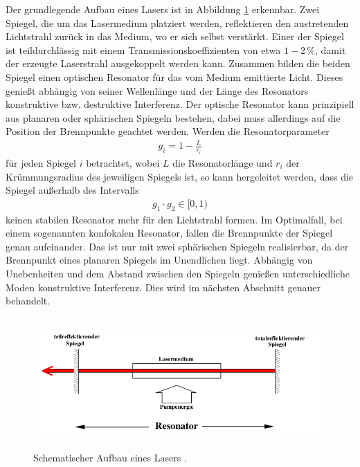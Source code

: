 Der grundlegende Aufbau eines Lasers ist in Abbildung \ref{fig:laseraufbau} erkennbar.
Zwei Spiegel, die um das Lasermedium platziert werden, reflektieren den austretenden
Lichtstrahl zurück in das Medium, wo er sich selbst verstärkt. Einer der Spiegel ist
teildurchlässig mit einem Transmissionskoeffizienten von etwa $1-2 \, \si{\percent}$,
damit der erzeugte Laserstrahl ausgekoppelt werden kann. Zusammen bilden die beiden
Spiegel einen optischen Resonator für das vom Medium emittierte Licht. Dieses genießt
abhängig von seiner Wellenlänge und der Länge des Resonators konstruktive bzw. destruktive
Interferenz. Der optische Resonator kann
prinzipiell aus planaren oder sphärischen Spiegeln bestehen, dabei muss allerdings auf
die Position der Brennpunkte geachtet werden. Werden die Resonatorparameter
\begin{align}
  g_i = 1 - \frac{L}{r_i}
\end{align}
für jeden Spiegel $i$ betrachtet, wobei $L$ die Resonatorlänge und $r_i$ der Krümmungsradius
des jeweiligen Spiegels ist, so kann hergeleitet werden, dass die Spiegel außerhalb des Intervalls
\begin{align}
  g_1 \cdot g_2 \in [0,1)
  \label{eqn:stab}
\end{align}
keinen stabilen Resonator mehr für den Lichtstrahl formen. Im Optimalfall, bei einem sogenannten
konfokalen Resonator, fallen die Brennpunkte der Spiegel genau aufeinander. Das ist nur mit
zwei sphärischen Spiegeln realisierbar, da der Brennpunkt eines planaren Spiegels im Unendlichen
liegt. Abhängig von Unebenheiten und dem Abstand zwischen den Spiegeln genießen unterschiedliche
Moden konstruktive Interferenz. Dies wird im nächsten Abschnitt genauer behandelt.

\begin{figure}
  \centering
  \includegraphics[height=5cm]{Pics von Buddy/laseraufbau.png}
  \caption{Schematischer Aufbau eines Lasers \cite{anleitung}.}
  \label{fig:laseraufbau}
\end{figure}

